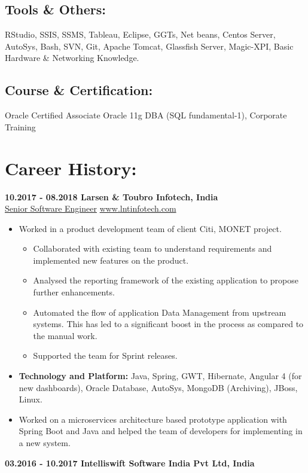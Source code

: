 \documentclass{article}
\begin{document}
\subsection{Tools \& Others:} RStudio, SSIS, SSMS, Tableau, Eclipse, GGTs, Net beans, Centos Server, AutoSys, Bash, SVN, Git, Apache Tomcat, Glassfish Server, Magic-XPI, Basic Hardware \& Networking Knowledge.
\subsection{Course \& Certification:}
Oracle Certified Associate Oracle 11g DBA (SQL fundamental-1), Corporate Training

\section{\faBriefcase{} Career History:}
\textbf{10.2017 - 08.2018 \hfill Larsen \& Toubro Infotech, India \\}
\underline{Senior Software Engineer} \hfill \href{www.lntinfotech.com}{www.lntinfotech.com}
\begin{itemize}
	\itemsep0em
	\item Worked in a product development team of client Citi, MONET project.
	\begin{itemize}
		\itemsep0em
		\item Collaborated with existing team to understand requirements and implemented new features on the product.
		\item Analysed the reporting framework of the existing application to propose further enhancements.
		\item Automated the flow of application Data Management from upstream systems. This has led to a significant boost in the process as compared to the manual work.
		\item Supported the team for Sprint releases.
	\end{itemize}
	\item \textbf{Technology and Platform:} Java, Spring, GWT, Hibernate, Angular 4 (for new dashboards), Oracle Database, AutoSys, MongoDB (Archiving), JBoss, Linux.
	\item Worked on a microservices architecture based prototype application with Spring Boot and Java and helped the team of developers for implementing in a new system.

\end{itemize}
\textbf{03.2016 - 10.2017 \hfill Intelliswift Software India Pvt Ltd, India\\}
\end{document}
